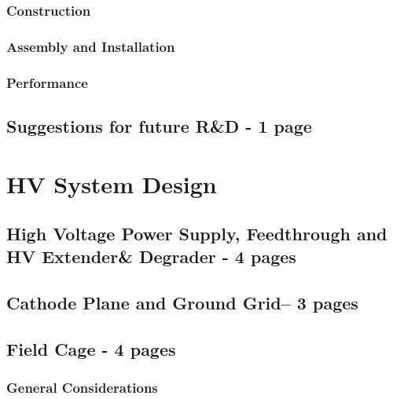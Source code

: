 \subsubsection{Construction}
\label{sec:fddp-hv-protodune-lessons-construction}
\subsubsection{Assembly and Installation}
\label{sec:fddp-hv-protodune-lessons-assy}
\subsubsection{Performance}
\label{sec:fddp-hv-protodune-lessons-perf}


\subsection{Suggestions for future R\&D - 1 page}
\label{sec:fddp-hv-protodune-RD}

\clearpage


\section{HV System Design}
\label{sec:fddp-hv-design}

\subsection {High Voltage Power Supply, Feedthrough and HV Extender\& Degrader - 4 pages}

\subsection{Cathode Plane and Ground Grid– 3 pages}

\subsection{Field Cage - 4 pages}

\subsubsection{General Considerations}

